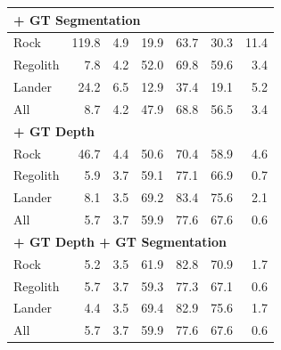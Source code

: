 \begin{table}[h]
\begin{tabular}[t]{|lrrrrrr|}
		\hline
		\multicolumn{7}{|l|}{\textbf{+ GT Segmentation}}                                          \\ \hline
		Rock                                           & 119.8 & 4.9  & 19.9 & 63.7 & 30.3 & 11.4 \\
		Regolith                                       & 7.8   & 4.2  & 52.0 & 69.8 & 59.6 & 3.4  \\
		Lander                                         & 24.2  & 6.5  & 12.9 & 37.4 & 19.1 & 5.2  \\
		All                                            & 8.7   & 4.2  & 47.9 & 68.8 & 56.5 & 3.4  \\
		\hline
		\multicolumn{7}{|l|}{\textbf{+ GT Depth}}                                                 \\ \hline
		Rock                                           & 46.7  & 4.4  & 50.6 & 70.4 & 58.9 & 4.6  \\
		Regolith                                       & 5.9   & 3.7  & 59.1 & 77.1 & 66.9 & 0.7  \\
		Lander                                         & 8.1   & 3.5  & 69.2 & 83.4 & 75.6 & 2.1  \\
		All                                            & 5.7   & 3.7  & 59.9 & 77.6 & 67.6 & 0.6  \\
		\hline
		\multicolumn{7}{|l|}{\textbf{+ GT Depth + GT Segmentation}}                               \\ \hline
		Rock                                           & 5.2   & 3.5  & 61.9 & 82.8 & 70.9 & 1.7  \\
		Regolith                                       & 5.7   & 3.7  & 59.3 & 77.3 & 67.1 & 0.6  \\
		Lander                                         & 4.4   & 3.5  & 69.4 & 82.9 & 75.6 & 1.7  \\
		All                                            & 5.7   & 3.7  & 59.9 & 77.6 & 67.6 & 0.6  \\
		\hline
	\end{tabular}
\end{table}